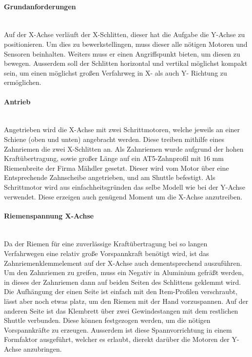 \paragraph{Grundanforderungen}\mbox{}\\
Auf der X-Achse verläuft der X-Schlitten, dieser hat die Aufgabe die Y-Achse zu positionieren. Um dies zu bewerkstellingen, muss dieser alle nötigen Motoren und Sensoren beinhalten. Weiters muss er einen Angriffspunkt bieten, um diesen zu bewegen. Ausserdem soll der Schlitten horizontal und vertikal möglichst kompakt sein, um einen möglichst großen Verfahrweg in X- als auch Y- Richtung zu ermöglichen.

\paragraph{Antrieb}\mbox{}\\
Angetrieben wird die X-Achse mit zwei Schrittmotoren, welche jeweils an einer Schiene (oben und unten) angebracht werden. Diese treiben mithilfe eines Zahnriemen die zwei X-Schlitten an. Als Zahnriemen wurde aufgrund der hohen Kraftübertragung, sowie großer Länge auf ein AT5-Zahnprofil mit 16 mm Riemenbreite der Firma Mähdler gesetzt. Dieser wird vom Motor über eine Entsprechende Zahnscheibe angetrieben, und am Shuttle befestigt. Als Schrittmotor wird aus einfachheitsgründen das selbe Modell wie bei der Y-Achse verwendet. Diese erzeigen auch genügend Moment um die X-Achse anzutreiben.

\paragraph{Riemenspannung X-Achse} \mbox{}\\
Da der Riemen für eine zuverlässige Kraftübertragung bei so langen Verfahrwegen eine relativ große Vorspannkraft benötigt wird, ist das Zahnriemenklemmelement auf der X-Achse auch dementsprechend auszuführen. Um den Zahnriemen zu greifen, muss ein Negativ in Aluminium gefräßt werden, in dieses der Zahnriemen dann auf beiden Seiten des Schlittens geklemmt wird. Die Aufhängung der einen Seite ist einfach mit den Item-Profilen verschraubt, lässt aber noch etwas platz, um den Riemen mit der Hand vorzuspannen. Auf der anderen Seite ist das Klembrett über zwei Gewindestangen mit dem restlichen Shuttle verbunden. Diese können festgezogen werden, um die nötigen Vorspannkräfte zu erzeugen. Ausserdem ist diese Spannvorrichtung in einem Formfaktor ausgeführt, welcher es erlaubt, dierekt darüber die Motoren der Y-Achse anzubringen. 

